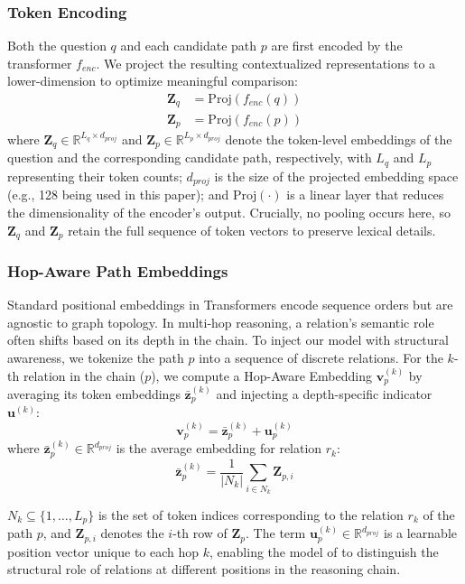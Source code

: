 \documentclass[conference]{IEEEtran}
\begin{document}
\subsubsection{Token Encoding}
Both the question $q$ and each candidate path $p$ are first encoded by the transformer $f_{enc}$. We project the resulting contextualized representations to a lower-dimension to optimize meaningful comparison:
\begin{align}
    \mathbf{Z}_{q} &= \text{Proj}(f_{enc}(q)) \\
    \mathbf{Z}_{p} &= \text{Proj}(f_{enc}(p))
\end{align}
\noindent where $\mathbf{Z}_{q} \in \mathbb{R}^{L_q \times d_{proj}}$ and $\mathbf{Z}_{p} \in \mathbb{R}^{L_p \times d_{proj}}$ denote the token-level embeddings of the question and the corresponding candidate path, respectively, with $L_q$ and $L_p$ representing their token counts;  $d_{proj}$ is the size of the projected embedding space (e.g., 128 being used in this paper); and $\text{Proj}(\cdot)$ is a linear layer that reduces the dimensionality of the encoder's output. Crucially, no pooling occurs here, so $\mathbf{Z}_{q}$ and $\mathbf{Z}_{p}$ retain the full sequence of token vectors to preserve lexical details.

\subsubsection{Hop-Aware Path Embeddings}
Standard positional embeddings in Transformers encode sequence orders but are agnostic to graph topology. In multi-hop reasoning, a relation's semantic role often shifts based on its depth in the chain. To inject our model with structural awareness, we tokenize the path $p$ into a sequence of discrete relations. For the $k$-th relation in the chain ($p$), we compute a Hop-Aware Embedding $\mathbf{v}_p^{(k)}$ by averaging its token embeddings $\mathbf{\bar{z}}_p^{(k)}$ and injecting a depth-specific indicator $\mathbf{u}^{(k)}$:
\begin{equation}
\mathbf{v}_p^{(k)}
=
\mathbf{\bar{z}}_p^{(k)}
+
\mathbf{u}_p^{(k)}
\end{equation}
\noindent where $\mathbf{\bar{z}}_p^{(k)} \in \mathbb{R}^{d_{proj}}$ is the average embedding for relation $r_k$:
\[
\mathbf{\bar{z}}_p^{(k)}
=
\frac{1}{\lvert N_k \rvert}
\sum_{i \in N_k} \mathbf{Z}_{p,i}
\]


\noindent $N_k \subseteq \{1, \ldots, L_p\}$ is the set of token indices corresponding to the relation $r_k$ of the path $p$, and $\mathbf{Z}_{p,i}$ denotes the $i$-th row of $\mathbf{Z}_p$. The term $\mathbf{u}_p^{(k)} \in \mathbb{R}^{d_{proj}}$ is a learnable position vector unique to each hop $k$, enabling the model of to distinguish the structural role of relations at different positions in the reasoning chain.
\end{document}
